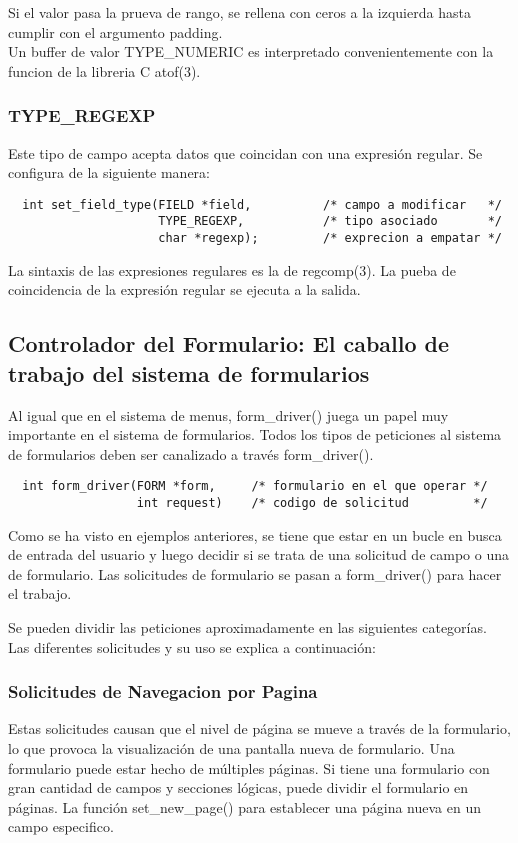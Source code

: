 \documentclass{article}
\begin{document}
Si el valor pasa la prueva de rango, se rellena con ceros a la izquierda hasta
cumplir con el argumento padding.\\

Un buffer de valor TYPE\_NUMERIC es interpretado convenientemente con la funcion
de la libreria C atof(3).

\subsubsection*{TYPE\_REGEXP}%
Este tipo de campo acepta datos que coincidan con una expresión regular. Se
configura de la siguiente manera:

\begin{verbatim}
  int set_field_type(FIELD *field,          /* campo a modificar   */
                     TYPE_REGEXP,           /* tipo asociado       */
                     char *regexp);         /* exprecion a empatar */
\end{verbatim}

La sintaxis de las expresiones regulares es la de regcomp(3). La pueba de
coincidencia de la expresión regular se ejecuta a la salida.

\subsection{Controlador del Formulario: El caballo de trabajo del sistema de formularios}%
Al igual que en el sistema de menus, form\_driver() juega un papel muy
importante en el sistema de formularios. Todos los tipos de peticiones al
sistema de formularios deben ser canalizado a través form\_driver().

\begin{verbatim}
  int form_driver(FORM *form,     /* formulario en el que operar */
                  int request)    /* codigo de solicitud         */
\end{verbatim}

Como se ha visto en ejemplos anteriores, se tiene que estar en un bucle en
busca de entrada del usuario y luego decidir si se trata de una solicitud de
campo o una de formulario. Las solicitudes de formulario se pasan a
form\_driver() para hacer el trabajo.

Se pueden dividir las peticiones aproximadamente en las siguientes categorías.
Las diferentes solicitudes y su uso se explica a continuación:

\subsubsection{Solicitudes de Navegacion por Pagina}%
Estas solicitudes causan que el nivel de página se mueve a través de la
formulario, lo que provoca la visualización de una pantalla nueva de
formulario. Una formulario puede estar hecho de múltiples páginas. Si tiene una
formulario con gran cantidad de campos y secciones lógicas, puede dividir el
formulario en páginas. La función set\_new\_page() para establecer una página
nueva en un campo especifico.
\end{document}

